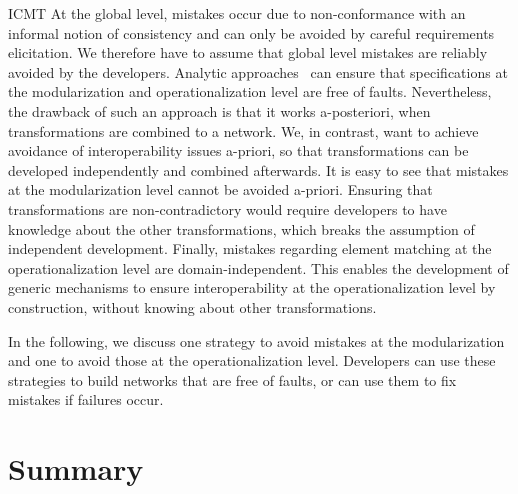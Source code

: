\begin{copiedFrom}{ICMT}
At the global level, mistakes occur due to non-conformance with an informal notion of consistency and %
can only be avoided by careful requirements elicitation. 
We therefore have to assume that global level mistakes are reliably avoided by the developers.
Analytic approaches~\cite{klare2018docsym}
can ensure that specifications at the modularization and operationalization level are free of faults.
Nevertheless, %
the drawback of such an approach is that it works a-posteriori, when transformations are combined to a network. %
We, in contrast, want to achieve avoidance of interoperability issues a-priori, so that transformations can be developed independently and combined afterwards.
It is easy to see that mistakes at the modularization level cannot be avoided a-priori. 
Ensuring that transformations are non-contradictory %
would require developers to have knowledge about the other transformations, which breaks the assumption of independent development.
%
Finally, mistakes regarding element matching at the operationalization level are domain-independent. 
This enables the development of generic mechanisms to ensure interoperability at the operationalization level by construction, without knowing about other transformations.

In the following, we discuss one strategy to avoid mistakes at the modularization and one to avoid those at the operationalization level.
Developers can use these strategies to build networks that are free of faults, or can use them to fix mistakes if failures occur.


\end{copiedFrom} %


\section{Summary}

